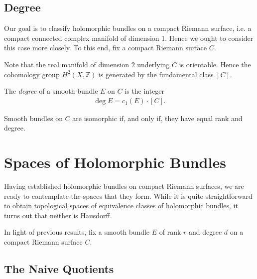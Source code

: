 \documentclass[12pt]{ociamthesis}  %
\begin{document}
\subsection{Degree}

Our goal is to classify holomorphic bundles on a compact Riemann surface,
i.e. a compact connected complex manifold of dimension 1. Hence we
ought to consider this case more closely. To this end, fix a compact
Riemann surface $C$.


Note that the real manifold of dimension $2$ underlying $C$ is orientable. \missingcitation
Hence the cohomology group $H^2(X,\mathbb{Z})$ is generated by the
fundamental class $[C]$.

\begin{definition}
  The \emph{degree} of a smooth bundle $E$ on $C$ is the integer
  \begin{align*}
    \deg E = c_1(E)\cdot[C].
  \end{align*}
\end{definition}

\begin{theorem}
  Smooth bundles on $C$ are isomorphic if, and only if, they have
  equal rank and degree.
\end{theorem}

\missingsection

\section{Spaces of Holomorphic Bundles}

Having established holomorphic bundles on compact Riemann surfaces,
we are ready to contemplate the spaces that they form. While it is
quite straightforward to obtain topological spaces of equivalence
classes of holomorphic bundles, it turns out that neither is Hausdorff.

In light of previous results, fix a smooth bundle $E$ of rank $r$
and degree $d$ on a compact Riemann surface $C$.

\subsection{The Naive Quotients}
\end{document}
